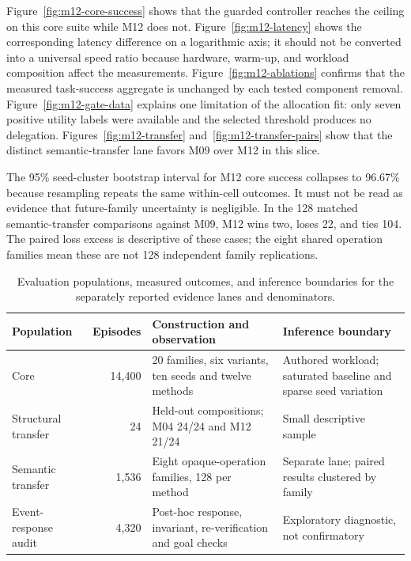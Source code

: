 \documentclass[11pt]{article}
\begin{document}
Figure~\ref{fig:m12-core-success} shows that the guarded controller reaches the ceiling on this core suite while M12 does not. Figure~\ref{fig:m12-latency} shows the corresponding latency difference on a logarithmic axis; it should not be converted into a universal speed ratio because hardware, warm-up, and workload composition affect the measurements. Figure~\ref{fig:m12-ablations} confirms that the measured task-success aggregate is unchanged by each tested component removal. Figure~\ref{fig:m12-gate-data} explains one limitation of the allocation fit: only seven positive utility labels were available and the selected threshold produces no delegation. Figures~\ref{fig:m12-transfer} and~\ref{fig:m12-transfer-pairs} show that the distinct semantic-transfer lane favors M09 over M12 in this slice.

The 95\% seed-cluster bootstrap interval for M12 core success collapses to 96.67\% because resampling repeats the same within-cell outcomes. It must not be read as evidence that future-family uncertainty is negligible. In the 128 matched semantic-transfer comparisons against M09, M12 wins two, loses 22, and ties 104. The paired loss excess is descriptive of these cases; the eight shared operation families mean these are not 128 independent family replications.

\begin{table}[ht]
\centering\small
\caption{Evaluation populations, measured outcomes, and inference boundaries for the separately reported evidence lanes and denominators.}
\label{tab:evaluation-populations}
\begin{tabularx}{\linewidth}{l r X X}\toprule
Population & Episodes & Construction and observation & Inference boundary \\\midrule
Core & 14,400 & 20 families, six variants, ten seeds and twelve methods & Authored workload; saturated baseline and sparse seed variation \\
Structural transfer & 24 & Held-out compositions; M04 24/24 and M12 21/24 & Small descriptive sample \\
Semantic transfer & 1,536 & Eight opaque-operation families, 128 per method & Separate lane; paired results clustered by family \\
Event-response audit & 4,320 & Post-hoc response, invariant, re-verification and goal checks & Exploratory diagnostic, not confirmatory \\\bottomrule
\end{tabularx}
\end{table}
\end{document}

